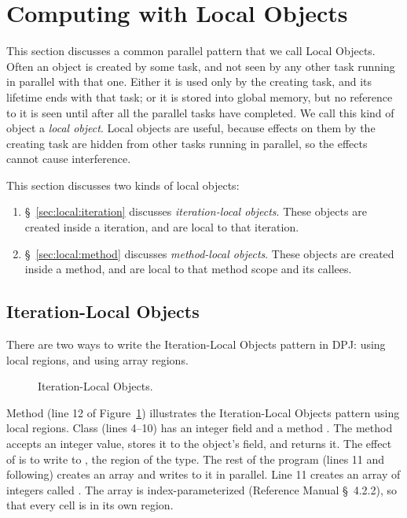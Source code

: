 \section{Computing with Local Objects%
\label{sec:local}}

This section discusses a common parallel pattern that we call Local
Objects.  Often an object is created by some task, and not seen by any
other task running in parallel with that one.  Either it is used only
by the creating task, and its lifetime ends with that task; or it is
stored into global memory, but no reference to it is seen until after
all the parallel tasks have completed.  We call this kind of object a
\emph{local object}.  Local objects are useful, because effects on
them by the creating task are hidden from other tasks running in
parallel, so the effects cannot cause interference.

This section discusses two kinds of local objects:
%
\begin{enumerate}
%
\item \S~\ref{sec:local:iteration} discusses \emph{iteration-local
  objects}.  These objects are created inside a 
  iteration, and are local to that iteration.
%
\item \S~\ref{sec:local:method} discusses \emph{method-local objects}.
  These objects are created inside a method, and are local to that
  method scope and its callees.
%
\end{enumerate}
%


\subsection{Iteration-Local Objects%
\label{sec:local:iteration}}

There are two ways to write the Iteration-Local Objects pattern in
DPJ: using local regions, and using array regions.

\begin{figure}

\caption{Iteration-Local Objects.}
\label{fig:local:iteration:pattern}
\end{figure}

 Method
 (line 12 of
Figure~\ref{fig:local:iteration:pattern}) illustrates the
Iteration-Local Objects pattern using local regions.  Class
 (lines 4--10) has an integer field  and a
method .  The  method accepts an
integer value, stores it to the object's  field, and
returns it.  The effect of  is to write to ,
the region of the  type.  The rest of the program
(lines 11 and following) creates an array and writes to it in
parallel.  Line 11 creates an array of integers called .
The array is index-parameterized (Reference Manual \S~4.2.2), so that
every cell is in its own region.

